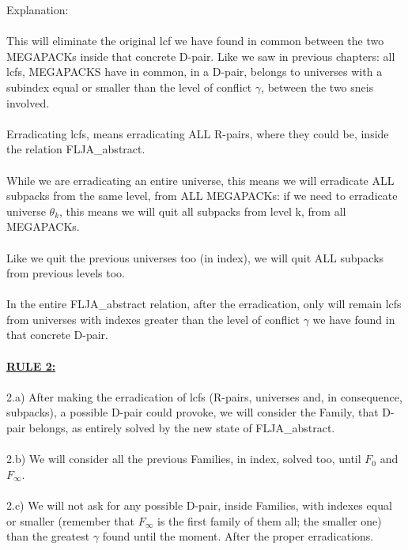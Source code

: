 			\noindent
			Explanation:\\\\
			This will eliminate the original lcf we have found in common between the two MEGAPACKs inside that concrete D-pair. Like we saw in previous chapters: all lcfs, MEGAPACKS have in common, in a D-pair, belongs to universes with a subindex equal or smaller than the level of conflict $\gamma$, between the two sneis involved.\\\\
			Erradicating lcfs, means erradicating ALL R-pairs, where they could be, inside the relation FLJA\_abstract.\\\\
			While we are erradicating an entire universe, this means we will erradicate ALL subpacks from the same level, from ALL MEGAPACKs: if we need to erradicate universe $\theta_{k}$, this means we will quit all subpacks from level k, from all MEGAPACKs.\\\\
			Like we quit the previous universes too (in index), we will quit ALL subpacks from previous levels too.\\\\
			In the entire FLJA\_abstract relation, after the erradication, only will remain lcfs from universes with indexes greater than the level of conflict $\gamma$ we have found in that concrete D-pair.
			\\\\
			
			\noindent
			\textbf{\underline{RULE 2:}}\\\\
			2.a) After making the erradication of lcfs (R-pairs, universes and, in consequence, subpacks), a possible D-pair could provoke, we will consider the Family, that D-pair belongs, as entirely solved by the new state of FLJA\_abstract.\\\\
			2.b) We will consider all the previous Families, in index, solved too, until $F_{0}$ and $F_{\infty}$.\\\\
			2.c) We will not ask for any possible D-pair, inside Families, with indexes equal or smaller (remember that $F_{\infty}$ is the first family of them all; the smaller one) than the greatest $\gamma$ found until the moment. After the proper erradications.
			\\\\
			
